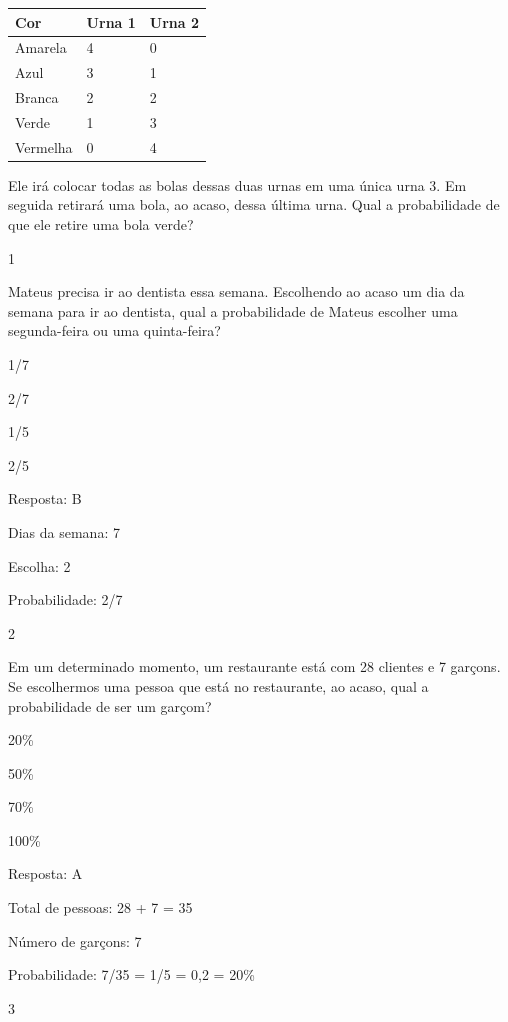 \begin{escolha}
\begin{escolha}
\begin{longtable}[]{@{}lll@{}}
\toprule
Cor & Urna 1 & Urna 2\tabularnewline
\midrule
\endhead
Amarela & 4 & 0\tabularnewline
Azul & 3 & 1\tabularnewline
Branca & 2 & 2\tabularnewline
Verde & 1 & 3\tabularnewline
Vermelha & 0 & 4\tabularnewline
\bottomrule
\end{longtable}

Ele irá colocar todas as bolas dessas duas urnas em uma única urna 3. Em
seguida retirará uma bola, ao acaso, dessa última urna. Qual a
probabilidade de que ele retire uma bola verde?



\num{1}

Mateus precisa ir ao dentista essa semana. Escolhendo ao acaso um dia da
semana para ir ao dentista, qual a probabilidade de Mateus escolher uma
segunda-feira ou uma quinta-feira?

\begin{escolha}
\item
  1/7
\item
  2/7
\item
  1/5
\item
  2/5
\end{escolha}

Resposta: B

Dias da semana: 7

Escolha: 2

Probabilidade: 2/7

\num{2}

Em um determinado momento, um restaurante está com 28 clientes e 7
garçons. Se escolhermos uma pessoa que está no restaurante, ao acaso,
qual a probabilidade de ser um garçom?

\begin{escolha}
\item
  20\%
\item
  50\%
\item
  70\%
\item
  100\%
\end{escolha}

Resposta: A

Total de pessoas: 28 + 7 = 35

Número de garçons: 7

Probabilidade: 7/35 = 1/5 = 0,2 = 20\%

\num{3}


\end{escolha}
\end{escolha}
